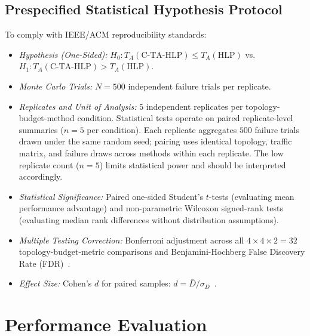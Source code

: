\documentclass[journal]{IEEEtran}
\begin{document}
\subsection{Prespecified Statistical Hypothesis Protocol}
To comply with IEEE/ACM reproducibility standards:
\begin{itemize}
    \item \textit{Hypothesis (One-Sided):} $H_0: T_A(\text{C-TA-HLP}) \le T_A(\text{HLP})$ vs. $H_1: T_A(\text{C-TA-HLP}) > T_A(\text{HLP})$.
    \item \textit{Monte Carlo Trials:} $N = 500$ independent failure trials per replicate.
    \item \textit{Replicates and Unit of Analysis:} $5$ independent replicates per topology-budget-method condition. Statistical tests operate on paired replicate-level summaries ($n=5$ per condition). Each replicate aggregates $500$ failure trials drawn under the same random seed; pairing uses identical topology, traffic matrix, and failure draws across methods within each replicate. The low replicate count ($n=5$) limits statistical power and should be interpreted accordingly.
    \item \textit{Statistical Significance:} Paired one-sided Student's $t$-tests (evaluating mean performance advantage) and non-parametric Wilcoxon signed-rank tests (evaluating median rank differences without distribution assumptions).
    \item \textit{Multiple Testing Correction:} Bonferroni adjustment across all $4 \times 4 \times 2 = 32$ topology-budget-metric comparisons and Benjamini-Hochberg False Discovery Rate (FDR)~\cite{benjamini1995controlling}.
    \item \textit{Effect Size:} Cohen's $d$ for paired samples: $d = \bar{D} / \sigma_D$~\cite{cohen1988statistical}.
\end{itemize}

\section{Performance Evaluation}
\end{document}
